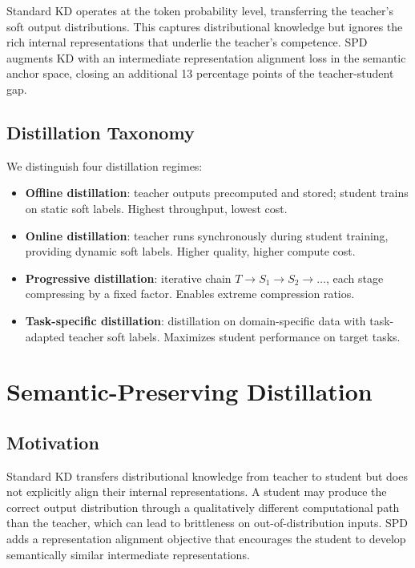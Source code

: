 \documentclass[11pt,a4paper]{article}
\begin{document}
Standard KD operates at the token probability level, transferring the teacher's
soft output distributions. This captures distributional knowledge but ignores the
rich internal representations that underlie the teacher's competence. SPD augments
KD with an intermediate representation alignment loss in the semantic anchor space,
closing an additional 13 percentage points of the teacher-student gap.

\subsection{Distillation Taxonomy}

We distinguish four distillation regimes:

\begin{itemize}
    \item \textbf{Offline distillation}: teacher outputs precomputed and stored; student
          trains on static soft labels. Highest throughput, lowest cost.
    \item \textbf{Online distillation}: teacher runs synchronously during student
          training, providing dynamic soft labels. Higher quality, higher compute cost.
    \item \textbf{Progressive distillation}: iterative chain $T \to S_1 \to S_2 \to \ldots$,
          each stage compressing by a fixed factor. Enables extreme compression ratios.
    \item \textbf{Task-specific distillation}: distillation on domain-specific data with
          task-adapted teacher soft labels. Maximizes student performance on target tasks.
\end{itemize}

\section{Semantic-Preserving Distillation}
\label{sec:spd}

\subsection{Motivation}

Standard KD transfers distributional knowledge from teacher to student but does not
explicitly align their internal representations. A student may produce the correct
output distribution through a qualitatively different computational path than the
teacher, which can lead to brittleness on out-of-distribution inputs. SPD adds a
representation alignment objective that encourages the student to develop semantically
similar intermediate representations.
\end{document}
